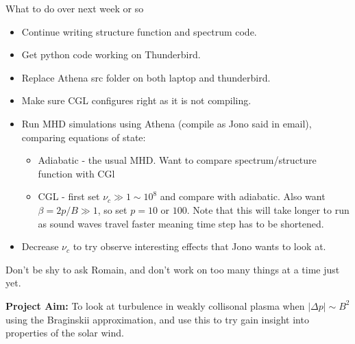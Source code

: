 \documentclass[12pt,letterpaper]{article}
\begin{document}
What to do over next week or so
\begin{itemize}
  \item Continue writing structure function and spectrum code.
  \item Get python code working on Thunderbird.
  \item Replace Athena src folder on both laptop and thunderbird.
  \item Make sure CGL configures right as it is not compiling.
  \item Run MHD simulations using Athena (compile as Jono said in email), comparing equations of state:
  \begin{itemize}
    \item Adiabatic - the usual MHD. Want to compare spectrum/structure function with CGl
    \item CGL - first set $\nu_c\gg 1 \sim 10^8$ and compare with adiabatic. Also want $\beta=2p/B\gg 1$, so set $p=10$ or $100$. Note that this will take longer to run as sound waves travel faster meaning time step has to be shortened.
  \end{itemize}
  \item Decrease $\nu_c$ to try observe interesting effects that Jono wants to look at.
\end{itemize}
Don't be shy to ask Romain, and don't work on too many things at a time just yet.

\textbf{Project Aim:} To look at turbulence in weakly collisonal plasma when $|\Delta p|\sim B^2$ using the Braginskii approximation, and use this to try gain insight into properties of the solar wind.
\end{document}
